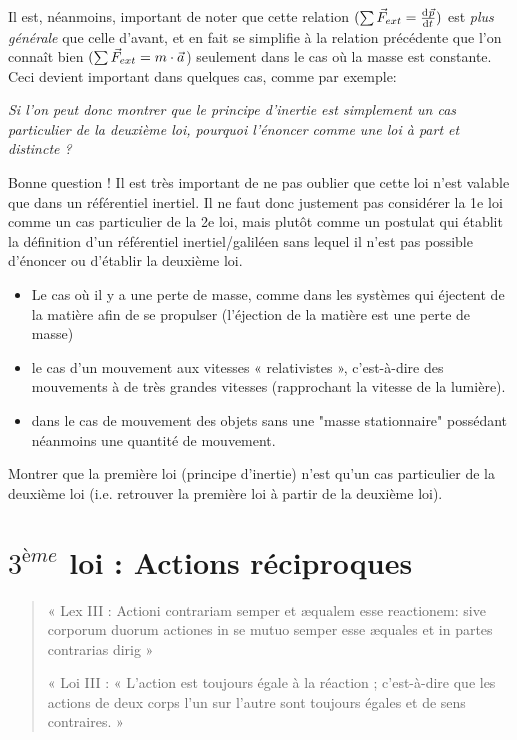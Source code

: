 \documentclass[11pt,a4paper]{article}
\begin{document}
Il est, néanmoins, important de noter que cette relation $(\sum \vec{F}_{ext} = \od{\vp}{t})$ est \textit{plus générale} que celle d’avant, et en fait se simplifie à la relation précédente que l’on connaît bien $(\sum \vec{F}_{ext} = m\cdot\vec{a}$) seulement dans le cas où la masse est constante. Ceci devient important dans quelques cas, comme par exemple: 

\begingroup
\setlength{\columnsep}{15pt}%
\setlength{\intextsep}{-10pt}%
\begin{table}
\begin{rmrq}
\small{ \emph{Si l’on peut donc montrer que le principe d’inertie est simplement un cas particulier de la deuxième loi, pourquoi l’énoncer comme une loi à part et distincte ? }

Bonne question ! Il est très important de ne pas oublier que cette loi n’est valable que dans un référentiel inertiel. Il ne faut donc justement pas considérer la 1e loi comme un cas particulier de la 2e loi, mais plutôt comme un postulat qui établit la définition d’un référentiel inertiel/galiléen sans lequel il n’est pas possible d’énoncer ou d’établir la deuxième loi.}
\end{rmrq}
\end{table}

\begin{itemize}
    \item Le cas où il y a une perte de masse, comme dans les systèmes qui éjectent de la matière afin de se propulser (l’éjection de la matière est une perte de masse)
    \item le cas d’un mouvement aux vitesses « relativistes », c’est-à-dire des mouvements à de très grandes vitesses (rapprochant la vitesse de la lumière).
    \item dans le cas de mouvement des objets sans une "masse stationnaire" possédant néanmoins une quantité de mouvement.
\end{itemize}

\begin{exo}
Montrer que la première loi (principe d’inertie) n’est qu’un cas particulier de la deuxième loi (i.e. retrouver la première loi à partir de la deuxième loi).  
\vspace{4.9cm}
\end{exo}
	
\endgroup	 

\section{$3^{ème}$ loi : Actions réciproques}
\begin{quote}
    \centering
    \small{« Lex III : Actioni contrariam semper et æqualem esse reactionem: sive corporum duorum actiones in se mutuo semper esse æquales et in partes contrarias dirig »}
    
    \small{« Loi III : « L'action est toujours égale à la réaction ; c'est-à-dire que les actions de deux corps l'un sur l'autre sont toujours égales et de sens contraires. »}
\end{quote}
\end{document}
